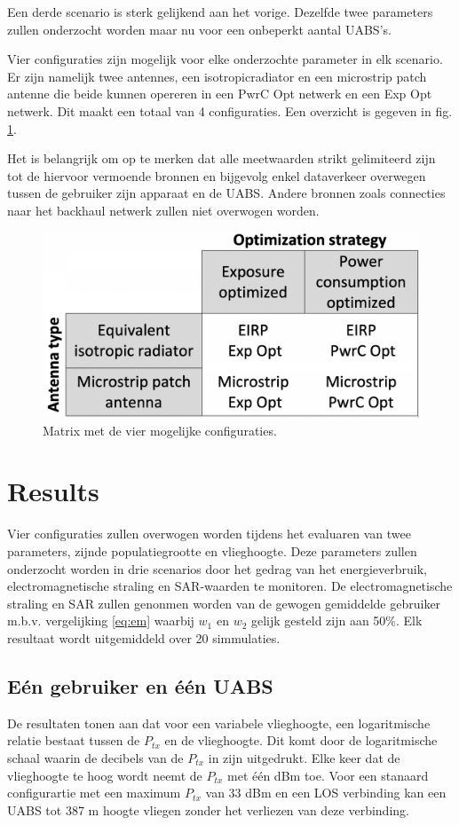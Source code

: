 \documentclass[twocolumn]{phdsymp_dutch}
\begin{document}
Een derde scenario is sterk gelijkend aan het vorige. Dezelfde twee parameters zullen onderzocht 
worden maar nu voor een onbeperkt aantal \gls{UABS}'s.

Vier configuraties zijn mogelijk voor elke onderzochte parameter in elk scenario.
Er zijn namelijk twee antennes, een \gls{isotropicradiator} en een microstrip patch antenne die
beide kunnen opereren in een \gls{PwrC Opt} netwerk en een \gls{Exp Opt} netwerk. Dit maakt een totaal van 4 configuraties.
Een overzicht is gegeven in fig. \ref{fig:fourCasesMatrix}.

Het is belangrijk om op te merken dat alle meetwaarden strikt gelimiteerd zijn tot de hiervoor vermoende bronnen en 
bijgevolg enkel dataverkeer overwegen tussen de gebruiker zijn apparaat en de \gls{UABS}. 
Andere bronnen zoals connecties naar het backhaul netwerk zullen niet overwogen worden.

\begin{figure}[h!]
\centering
  \includegraphics[width=0.6\linewidth]{fourCasesMatrix.png}
  \caption{Matrix met de vier mogelijke configuraties.}
  \label{fig:fourCasesMatrix}
\end{figure}

\section{Results}
Vier configuraties zullen overwogen worden tijdens het evaluaren van twee parameters, zijnde 
populatiegrootte en vlieghoogte. Deze parameters zullen onderzocht worden in drie scenarios 
door het gedrag van het energieverbruik, electromagnetische straling en \gls{SAR}-waarden te monitoren.
De electromagnetische straling en \gls{SAR} zullen genonmen worden van de gewogen gemiddelde gebruiker
m.b.v. vergelijking \ref{eq:em} waarbij $w_{1}$ en $w_{2}$ gelijk gesteld zijn aan 50\%. 
Elk resultaat wordt uitgemiddeld over 20 simmulaties.


\subsection{E\'en gebruiker en \'e\'en \gls{UABS}}
De resultaten tonen aan dat voor een variabele vlieghoogte, een logaritmische relatie bestaat tussen de 
 $P_{tx}$ en de vlieghoogte.
 Dit komt door de logaritmische schaal waarin de decibels van de $P_{tx}$ in zijn uitgedrukt.
Elke keer dat de vlieghoogte te hoog wordt neemt de $P_{tx}$ met \'e\'en dBm toe.
Voor een stanaard configurartie met een maximum $P_{tx}$ van 33 dBm en een \gls{LOS} verbinding kan een 
\gls{UABS} tot 387 m hoogte vliegen zonder het verliezen van deze verbinding.
\end{document}
